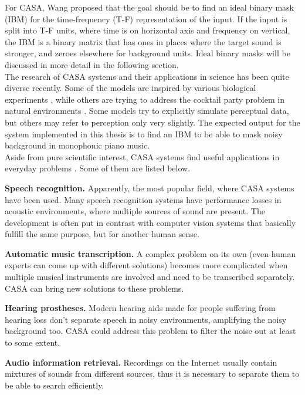 For CASA, Wang \cite{Wang2006} proposed that the goal should be to find an ideal binary mask (IBM) for the time-frequency (T-F) representation of the input. If the input is split into T-F units, where time is on horizontal axis and frequency on vertical, the IBM is a binary matrix that has ones in places where the target sound is stronger, and zeroes elsewhere for background units. Ideal binary masks will be discussed in more detail in the following section.\\

The research of CASA systems and their applications in science \cite{Szabo2016} has been quite diverse recently. Some of the models are inspired by various biological experiments \cite{Wang2008}\cite{Boes2011}, while others are trying to address the cocktail party problem in natural environments \cite{Elhilali2008}. Some models try to explicitly simulate perceptual data, but others may refer to perception only very slightly. The expected output for the system implemented in this thesis is to find an IBM to be able to mask noisy background in monophonic piano music.\\

Aside from pure scientific interest, CASA systems find useful applications in everyday problems \cite{Wang2006}. Some of them are listed below.

\begin{description}
	\item\textbf{Speech recognition.} Apparently, the most popular field, where CASA systems have been used. Many speech recognition systems have performance losses in acoustic environments, where multiple sources of sound are present. The development is often put in contrast with computer vision systems that basically fulfill the same purpose, but for another human sense.
	\item\textbf{Automatic music transcription.} A complex problem on its own (even human experts can come up with different solutions) becomes more complicated when multiple musical instruments are involved and need to be transcribed separately. CASA can bring new solutions to these problems.
	\item\textbf{Hearing prostheses.} Modern hearing aids made for people suffering from hearing loss don't separate speech in noisy environments, amplifying the noisy background too. CASA could address this problem to filter the noise out at least to some extent.
	\item\textbf{Audio information retrieval.} Recordings on the Internet usually contain mixtures of sounds from different sources, thus it is necessary to separate them to be able to search efficiently.
\end{description}


